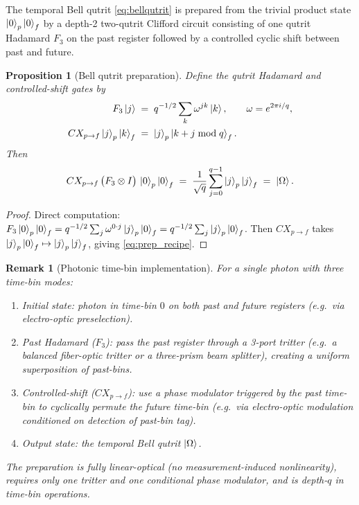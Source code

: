 ﻿\documentclass[12pt]{article}
\newtheorem{proposition}[theorem]{Proposition}
\newtheorem{remark}[theorem]{Remark}
\begin{document}
The temporal Bell qutrit \eqref{eq:bellqutrit} is prepared from the trivial
product state $\ket{0}_p \ket{0}_f$ by a depth-2 two-qutrit Clifford circuit
consisting of one qutrit Hadamard $F_3$ on the past register followed by a
controlled cyclic shift between past and future.

\begin{proposition}[Bell qutrit preparation]\label{prop:prep}
Define the qutrit Hadamard and controlled-shift gates by
\begin{align}
  F_3\ket{j} &\;=\; q^{-1/2}\sum_k \omega^{jk}\ket{k},
  &\omega &= e^{2\pi i / q},
  \\
  CX_{p\to f}\ket{j}_p\ket{k}_f &\;=\; \ket{j}_p\ket{k + j \bmod q}_f.
\end{align}
Then
\begin{equation}
  CX_{p\to f} \,\bigl(F_3 \otimes I\bigr)\,\ket{0}_p\ket{0}_f
  \;=\; \frac{1}{\sqrt q}\sum_{j=0}^{q-1}\ket{j}_p\ket{j}_f
  \;=\; \ket{\Omega}.
  \label{eq:prep_recipe}
\end{equation}
\end{proposition}

\begin{proof}
Direct computation: $F_3\ket{0}_p\ket{0}_f =
q^{-1/2}\sum_j\omega^{0\cdot j}\ket{j}_p\ket{0}_f = q^{-1/2}\sum_j\ket{j}_p\ket{0}_f$.
Then $CX_{p\to f}$ takes $\ket{j}_p\ket{0}_f \mapsto \ket{j}_p\ket{j}_f$, giving
\eqref{eq:prep_recipe}.
\end{proof}

\begin{remark}[Photonic time-bin implementation]\label{rem:photonic_prep}
For a single photon with three time-bin modes:
\begin{enumerate}[label=(\alph*),noitemsep]
  \item Initial state: photon in time-bin $0$ on both past and future
    registers (e.g.\ via electro-optic preselection).
  \item Past Hadamard ($F_3$): pass the past register through a 3-port
    tritter (e.g.\ a balanced fiber-optic tritter or a three-prism beam
    splitter), creating a uniform superposition of past-bins.
  \item Controlled-shift ($CX_{p\to f}$): use a phase modulator triggered by
    the past time-bin to cyclically permute the future time-bin (e.g.\ via
    electro-optic modulation conditioned on detection of past-bin tag).
  \item Output state: the temporal Bell qutrit $\ket{\Omega}$.
\end{enumerate}
The preparation is fully linear-optical (no measurement-induced
nonlinearity), requires only one tritter and one conditional phase modulator,
and is depth-$q$ in time-bin operations.
\end{remark}
\end{document}
